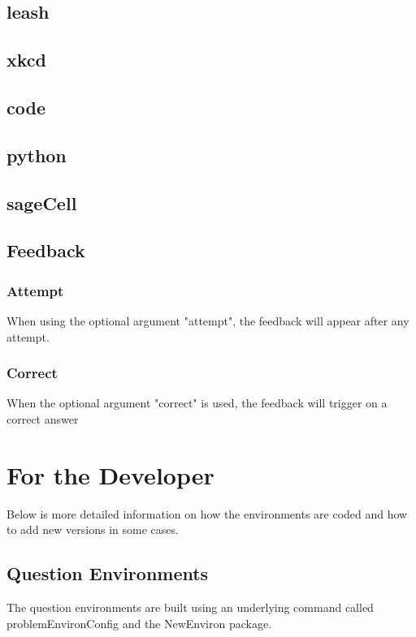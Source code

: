 \documentclass{ximera}
\begin{document}
	\subsection{leash}
	
	\subsection{xkcd}
	
	\subsection{code}
	
	\subsection{python}
	
	\subsection{sageCell}
	
	\subsection{Feedback}

		\subsubsection{Attempt}
		When using the optional argument "attempt", the feedback will appear after any attempt.
		\subsubsection{Correct}
		When the optional argument "correct" is used, the feedback will trigger on a correct answer

\newpage
\section{For the Developer}
Below is more detailed information on how the environments are coded and how to add new versions in some cases.

	\subsection{Question Environments}
	The question environments are built using an underlying command called problemEnvironConfig and the NewEnviron package. 
		
\end{document}

